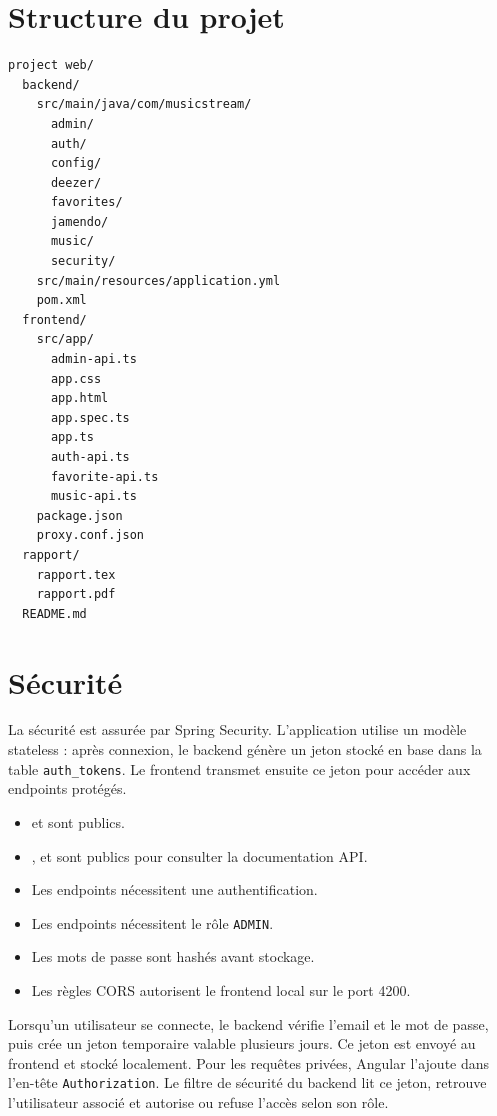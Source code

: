\documentclass[12pt,a4paper]{report}
\newcommand{\code}[1]{\texttt{#1}}
\begin{document}
\section{Structure du projet}

\begin{lstlisting}
project web/
  backend/
    src/main/java/com/musicstream/
      admin/
      auth/
      config/
      deezer/
      favorites/
      jamendo/
      music/
      security/
    src/main/resources/application.yml
    pom.xml
  frontend/
    src/app/
      admin-api.ts
      app.css
      app.html
      app.spec.ts
      app.ts
      auth-api.ts
      favorite-api.ts
      music-api.ts
    package.json
    proxy.conf.json
  rapport/
    rapport.tex
    rapport.pdf
  README.md
\end{lstlisting}

\section{Sécurité}

La sécurité est assurée par Spring Security. L'application utilise un modèle
stateless : après connexion, le backend génère un jeton stocké en base dans la
table \code{auth\_tokens}. Le frontend transmet ensuite ce jeton pour accéder
aux endpoints protégés.

\begin{itemize}
    \item {} et  sont publics.
    \item {},  et  sont publics pour consulter la documentation API.
    \item Les endpoints  nécessitent une authentification.
    \item Les endpoints  nécessitent le rôle \code{ADMIN}.
    \item Les mots de passe sont hashés avant stockage.
    \item Les règles CORS autorisent le frontend local sur le port 4200.
\end{itemize}

Lorsqu'un utilisateur se connecte, le backend vérifie l'email et le mot de
passe, puis crée un jeton temporaire valable plusieurs jours. Ce jeton est
envoyé au frontend et stocké localement. Pour les requêtes privées, Angular
l'ajoute dans l'en-tête \code{Authorization}. Le filtre de sécurité du backend
lit ce jeton, retrouve l'utilisateur associé et autorise ou refuse l'accès
selon son rôle.
\end{document}
